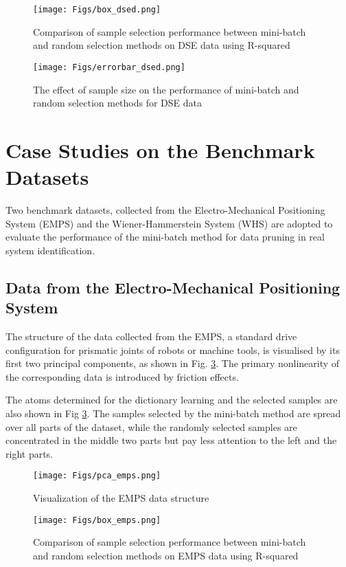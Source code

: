 \documentclass{article}
\begin{document}
\begin{figure}[htpb]
    \centering
    \texttt{[image: Figs/box\_dsed.png]}
    \caption{Comparison of sample selection performance between mini-batch and random selection methods on DSE data using R-squared}
    \label{fig:box_dsed}
\end{figure}

\begin{figure}[htpb]
    \centering
    \texttt{[image: Figs/errorbar\_dsed.png]}
    \caption{The effect of sample size on the performance of mini-batch and random selection methods for DSE data}
    \label{fig:errbar_dsed}
\end{figure}

\section{Case Studies on the Benchmark Datasets}
Two benchmark datasets, collected from the Electro-Mechanical Positioning System (EMPS) \cite{janot02178709} and the Wiener-Hammerstein System (WHS) \cite{schoukens2009wiener} are adopted to evaluate the performance of the mini-batch method for data pruning in real system identification. 

\subsection{Data from the Electro-Mechanical Positioning System}
The structure of the data collected from the EMPS, a standard drive configuration for prismatic joints of robots or machine tools, is visualised by its first two principal components, as shown in Fig. \ref{fig:pca_emps}. 
The primary nonlinearity of the corresponding data is introduced by friction effects. 

The atoms determined for the dictionary learning and the selected samples are also shown in Fig \ref{fig:pca_emps}. The samples selected by the mini-batch method are spread over all parts of the dataset, while the randomly selected samples are concentrated in the middle two parts but pay less attention to the left and the right parts.

\begin{figure}[htpb]
    \centering
    \texttt{[image: Figs/pca\_emps.png]}
    \caption{Visualization of the EMPS data structure}
    \label{fig:pca_emps}
\end{figure}


\begin{figure}[htpb]
    \centering
    \texttt{[image: Figs/box\_emps.png]}
    \caption{Comparison of sample selection performance between mini-batch and random selection methods on EMPS data using R-squared}
    \label{fig:box_emps}
\end{figure}
\end{document}
